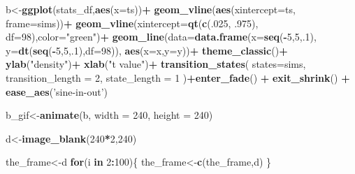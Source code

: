 \documentclass[
]{book}
\newenvironment{Shaded}{\begin{snugshade}}{\end{snugshade}}
\newcommand{\ControlFlowTok}[1]{\textcolor[rgb]{0.13,0.29,0.53}{\textbf{#1}}}
\newcommand{\DataTypeTok}[1]{\textcolor[rgb]{0.13,0.29,0.53}{#1}}
\newcommand{\DecValTok}[1]{\textcolor[rgb]{0.00,0.00,0.81}{#1}}
\newcommand{\FloatTok}[1]{\textcolor[rgb]{0.00,0.00,0.81}{#1}}
\newcommand{\KeywordTok}[1]{\textcolor[rgb]{0.13,0.29,0.53}{\textbf{#1}}}
\newcommand{\NormalTok}[1]{#1}
\newcommand{\OperatorTok}[1]{\textcolor[rgb]{0.81,0.36,0.00}{\textbf{#1}}}
\newcommand{\StringTok}[1]{\textcolor[rgb]{0.31,0.60,0.02}{#1}}
\begin{document}
\begin{Shaded}
\begin{Highlighting}[]
{{{{{{{{\NormalTok{b<-}\KeywordTok{ggplot}\NormalTok{(stats_df,}\KeywordTok{aes}\NormalTok{(}\DataTypeTok{x=}\NormalTok{ts))}\OperatorTok{+}
\StringTok{  }\KeywordTok{geom_vline}\NormalTok{(}\KeywordTok{aes}\NormalTok{(}\DataTypeTok{xintercept=}\NormalTok{ts, }\DataTypeTok{frame=}\NormalTok{sims))}\OperatorTok{+}
\StringTok{  }\KeywordTok{geom_vline}\NormalTok{(}\DataTypeTok{xintercept=}\KeywordTok{qt}\NormalTok{(}\KeywordTok{c}\NormalTok{(.}\DecValTok{025}\NormalTok{, }\FloatTok{.975}\NormalTok{), }\DataTypeTok{df=}\DecValTok{98}\NormalTok{),}\DataTypeTok{color=}\StringTok{"green"}\NormalTok{)}\OperatorTok{+}
\StringTok{  }\KeywordTok{geom_line}\NormalTok{(}\DataTypeTok{data=}\KeywordTok{data.frame}\NormalTok{(}\DataTypeTok{x=}\KeywordTok{seq}\NormalTok{(}\OperatorTok{-}\DecValTok{5}\NormalTok{,}\DecValTok{5}\NormalTok{,.}\DecValTok{1}\NormalTok{),}
                            \DataTypeTok{y=}\KeywordTok{dt}\NormalTok{(}\KeywordTok{seq}\NormalTok{(}\OperatorTok{-}\DecValTok{5}\NormalTok{,}\DecValTok{5}\NormalTok{,.}\DecValTok{1}\NormalTok{),}\DataTypeTok{df=}\DecValTok{98}\NormalTok{)),}
            \KeywordTok{aes}\NormalTok{(}\DataTypeTok{x=}\NormalTok{x,}\DataTypeTok{y=}\NormalTok{y))}\OperatorTok{+}
\StringTok{  }\KeywordTok{theme_classic}\NormalTok{()}\OperatorTok{+}
\StringTok{  }\KeywordTok{ylab}\NormalTok{(}\StringTok{"density"}\NormalTok{)}\OperatorTok{+}
\StringTok{  }\KeywordTok{xlab}\NormalTok{(}\StringTok{"t value"}\NormalTok{)}\OperatorTok{+}
\StringTok{  }\KeywordTok{transition_states}\NormalTok{(}
    \DataTypeTok{states=}\NormalTok{sims,}
    \DataTypeTok{transition_length =} \DecValTok{2}\NormalTok{,}
    \DataTypeTok{state_length =} \DecValTok{1}
\NormalTok{  )}\OperatorTok{+}\KeywordTok{enter_fade}\NormalTok{() }\OperatorTok{+}\StringTok{ }
\StringTok{  }\KeywordTok{exit_shrink}\NormalTok{() }\OperatorTok{+}
\StringTok{  }\KeywordTok{ease_aes}\NormalTok{(}\StringTok{'sine-in-out'}\NormalTok{)}

\NormalTok{b_gif<-}\KeywordTok{animate}\NormalTok{(b, }\DataTypeTok{width =} \DecValTok{240}\NormalTok{, }\DataTypeTok{height =} \DecValTok{240}\NormalTok{)}


\NormalTok{d<-}\KeywordTok{image_blank}\NormalTok{(}\DecValTok{240}\OperatorTok{*}\DecValTok{2}\NormalTok{,}\DecValTok{240}\NormalTok{)}

\NormalTok{the_frame<-d}
\ControlFlowTok{for}\NormalTok{(i }\ControlFlowTok{in} \DecValTok{2}\OperatorTok{:}\DecValTok{100}\NormalTok{)\{}
\NormalTok{  the_frame<-}\KeywordTok{c}\NormalTok{(the_frame,d)}
\NormalTok{\}}

}}}}}}}}
\end{Highlighting}
\end{Shaded}
\end{document}
